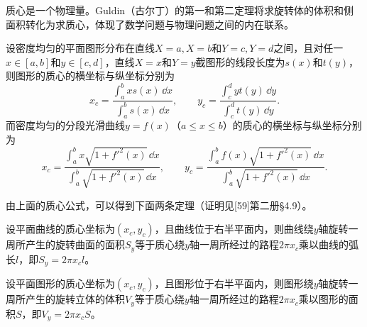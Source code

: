 质心是一个物理量。Guldin（古尔丁）的第一和第二定理将求旋转体的体积和侧面积转化为求质心，体现了数学问题与物理问题之间的内在联系。

\begin{xproposition}[11.1.1（质心公式）]
设密度均匀的平面图形分布在直线$X=a,X=b$和$Y=c,Y=d$之间，且对任一$x\in[a,b]$和$y\in[c,d]$，直线$X=x$和$Y=y$截图形的线段长度为$s(x)$和$t(y)$，则图形的质心的横坐标与纵坐标分别为
\begin{equation}
  x_c=\frac{\int_a^b xs(x)\,\dd x}{\int_a^b s(x)\,\dd x},\qquad
  y_c=\frac{\int_c^d yt(y)\,\dd y}{\int_c^d t(y)\,\dd y}.
  \tag{11.3}
  \label{eq:11.3}
\end{equation}
而密度均匀的分段光滑曲线$y=f(x)$（$a\le x\le b$）的质心的横坐标与纵坐标分别为
\begin{equation}
  x_c=\frac{\int_a^b x\sqrt{1+f'^2(x)}\,\dd x}{\int_a^b\sqrt{1+f'^2(x)}\,\dd x},\qquad
  y_c=\frac{\int_a^b f(x)\sqrt{1+f'^2(x)}\,\dd x}{\int_a^b\sqrt{1+f'^2(x)}\,\dd x}.
  \tag{11.4}
  \label{eq:11.4}
\end{equation}
\end{xproposition}

由上面的质心公式，可以得到下面两条定理（证明见[59]第二册§4.9）。

\begin{xproposition}[11.1.2（Guldin第一定理）]
设平面曲线的质心坐标为$(x_c,y_c)$，且曲线位于右半平面内，则曲线绕$y$轴旋转一周所产生的旋转曲面的面积$S_y$等于质心绕$y$轴一周所经过的路程$2\pi x_c$乘以曲线的弧长$l$，即$S_y=2\pi x_cl$。
\end{xproposition}

\begin{xproposition}[11.1.3（Guldin第二定理）]
设平面图形的质心坐标为$(x_c,y_c)$，且图形位于右半平面内，则图形绕$y$轴旋转一周所产生的旋转立体的体积$V_y$等于质心绕$y$轴一周所经过的路程$2\pi x_c$乘以图形的面积$S$，即$V_y=2\pi x_cS$。
\end{xproposition}

